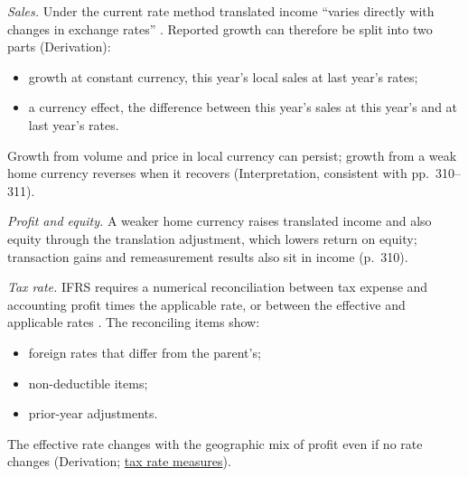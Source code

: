 \begin{qfmethod}\label{meth:multinational-currency-tax-analysis}
 \emph{Sales.} Under the current rate method translated income ``varies directly with changes in exchange rates'' \citep[p.~310]{financial-statement-analysis-2009}. Reported growth can therefore be split into two parts (Derivation):
\begin{itemize}
\item growth at constant currency, this year's local sales at last year's rates;
\item a currency effect, the difference between this year's sales at this year's and at last year's rates.
\end{itemize}
Growth from volume and price in local currency can persist; growth from a weak home currency reverses when it recovers (Interpretation, consistent with pp.~310--311).

\emph{Profit and equity.} A weaker home currency raises translated income and also equity through the translation adjustment, which lowers return on equity; transaction gains and remeasurement results also sit in income (p.~310).

\emph{Tax rate.} IFRS requires a numerical reconciliation between tax expense and accounting profit times the applicable rate, or between the effective and applicable rates \citep[para.~81(c)]{eu-2023-1803-ias12}. The reconciling items show:
\begin{itemize}
\item foreign rates that differ from the parent's;
\item non-deductible items;
\item prior-year adjustments.
\end{itemize}
The effective rate changes with the geographic mix of profit even if no rate changes (Derivation; \hyperref[meth:tax-rate-measures]{tax rate measures}).


\end{qfmethod}

